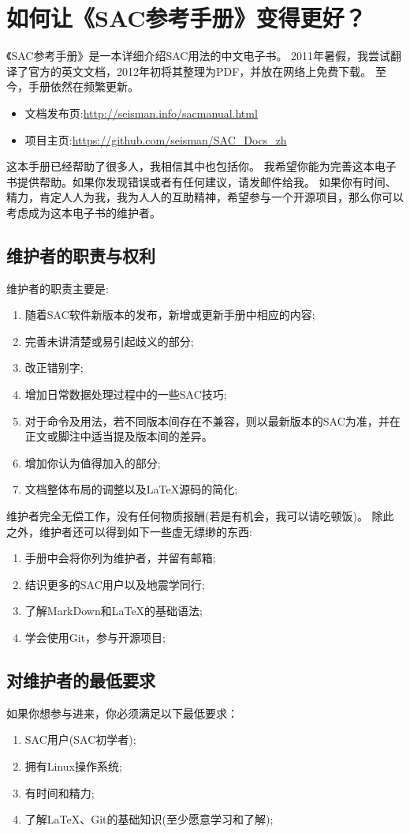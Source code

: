 \section{如何让《SAC参考手册》变得更好？}
《SAC参考手册》是一本详细介绍SAC用法的中文电子书。
2011年暑假，我尝试翻译了官方的英文文档，2012年初将其整理为PDF，并放在网络上免费下载。
至今，手册依然在频繁更新。
\begin{itemize}
\item 文档发布页:\url{http://seisman.info/sac­manual.html}
\item 项目主页:\url{https://github.com/seisman/SAC_Docs_zh }
\end{itemize}

这本手册已经帮助了很多人，我相信其中也包括你。
我希望你能为完善这本电子书提供帮助。如果你发现错误或者有任何建议，请发邮件给我。
如果你有时间、精力，肯定人人为我，我为人人的互助精神，希望参与一个开源项目，那么你可以考虑成为这本电子书的维护者。
\subsection{维护者的职责与权利}
维护者的职责主要是:
\begin{enumerate}
\item 随着SAC软件新版本的发布，新增或更新手册中相应的内容;
\item 完善未讲清楚或易引起歧义的部分;
\item 改正错别字;
\item 增加日常数据处理过程中的一些SAC技巧;
\item 对于命令及用法，若不同版本间存在不兼容，则以最新版本的SAC为准，并在正文或脚注中适当提及版本间的差异。
\item 增加你认为值得加入的部分;
\item 文档整体布局的调整以及LaTeX源码的简化;
\end{enumerate}

维护者完全无偿工作，没有任何物质报酬(若是有机会，我可以请吃顿饭)。
除此之外，维护者还可以得到如下一些虚无缥缈的东西:
\begin{enumerate}
\item 手册中会将你列为维护者，并留有邮箱;
\item 结识更多的SAC用户以及地震学同行;
\item 了解MarkDown和LaTeX的基础语法;
\item 学会使用Git，参与开源项目;
\end{enumerate}
\subsection{对维护者的最低要求}
如果你想参与进来，你必须满足以下最低要求：
\begin{enumerate}
\item SAC用户(SAC初学者);
\item 拥有Linux操作系统;
\item 有时间和精力;
\item 了解LaTeX、Git的基础知识(至少愿意学习和了解);
\end{enumerate}
